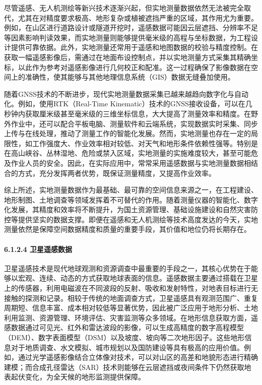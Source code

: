 尽管遥感、无人机测绘等新兴技术逐渐兴起，但实地测量数据依然无法被完全取代，尤其在对精度要求极高、地形复杂或植被遮挡严重的区域，其作用尤为重要。例如，在山区进行道路设计或隧道开挖时，遥感数据可能因云层遮挡、分辨率不足等因素影响判读效果，而实地测量则能够提供毫米级的高程与坐标数据，为工程设计提供可靠依据。此外，实地测量还常用于遥感和地图数据的校验与精度控制。在获取一幅遥感影像后，需通过在地面布设控制点，并以实地测量方式采集其精确坐标，以此作为参考对遥感影像进行几何校正和配准。这一过程确保了影像数据在空间上的准确性，使其能够与其他地理信息系统（GIS）数据无缝叠加使用。

随着GNSS技术的不断进步，现代实地测量数据采集已越来越趋向数字化与自动化。例如，使用RTK（Real-Time Kinematic）技术的GNSS接收设备，可以在几秒钟内获取厘米级甚至毫米级的三维坐标信息，大大提高了测量效率和精度。在野外作业中，还可以配合平板电脑、测量软件和云端系统，实现数据实时采集、同步上传与在线处理，推动了测量工作的智能化发展。然而，实地测量也存在一定的局限性，如工作强度大、作业效率相对较低、对天气和地形条件依赖性强等。特别是在高山峡谷、丛林湿地、危险或禁入区域，实地测量的实施难度较大，甚至可能危及作业人员的安全。因此，在实际应用中，常常采用遥感数据与实地测量数据相结合的方式，充分发挥两者优势，既保证测量精度，又提高作业效率。

综上所述，实地测量数据作为最基础、最可靠的空间信息来源之一，在工程建设、地形制图、土地调查等领域发挥着不可替代的作用。随着测量仪器的智能化、数字化发展，其精度和效率将不断提升，为国土资源管理、基础设施建设和自然灾害防控等提供坚实的数据支撑。即便在遥感和无人机测绘等技术高度发达的今天，实地测量依然是保障空间数据精度和质量的重要手段，其价值和地位仍将长期存在。

\hypertarget{ux536bux661fux9065ux611fux6570ux636e}{%
\paragraph{6.1.2.4 卫星遥感数据}\label{ux536bux661fux9065ux611fux6570ux636e}}

卫星遥感技术是现代地球观测和资源调查中最重要的手段之一，其核心优势在于能够以宏观、连续、动态的方式获取地球表面的信息。遥感数据主要通过搭载在卫星上的传感器，利用电磁波在不同波段的反射、吸收和发射特性，对地表目标进行无接触的探测和记录。相较于传统的地面调查方式，卫星遥感具有观测范围广、重复周期短、信息丰富、成本相对较低等显著优势，因此被广泛应用于地形分析、土地利用监测、资源管理、环境评估、灾害监测等众多领域。在地形信息获取方面，遥感数据通过可见光、红外和雷达波段的影像，可以生成高精度的数字高程模型（DEM）、数字表面模型（DSM）以及坡度、坡向等二次地形因子。这些地形信息对于地质调查、水文模拟、城市规划以及国防建设等具有极高的应用价值。例如，通过光学遥感影像结合立体像对技术，可以对山区的高差和地貌形态进行精确建模；而合成孔径雷达（SAR）技术则能够在云层遮挡或夜间条件下仍然获取地表起伏变化，为全天候的地形监测提供保障。

